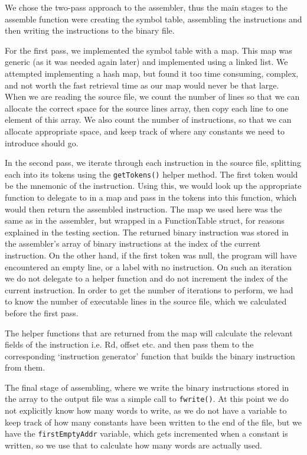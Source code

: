 \documentclass[a4paper]{article}
\begin{document}
We chose the two-pass approach to the assembler, thus the main stages to the assemble function were creating the symbol table, assembling the instructions and then writing the instructions to the binary file.

For the first pass, we implemented the symbol table with a map. This map was generic (as it was needed again later) and implemented using a linked list. We attempted implementing a hash map, but found it too time consuming, complex, and not worth the fast retrieval time as our map would never be that large. When we are reading the source file, we count the number of lines so that we can allocate the correct space for the source lines array, then copy each line to one element of this array. We also count the number of instructions, so that we can allocate appropriate space, and keep track of where any constants we need to introduce should go.

In the second pass, we iterate through each instruction in the source file, splitting each into its tokens using the \texttt{getTokens()} helper method. The first token would be the mnemonic of the instruction. Using this, we would look up the appropriate function to delegate to in a map and pass in the tokens into this function, which would then return the assembled instruction. The map we used here was the same as in the assembler, but wrapped in a FunctionTable struct, for reasons explained in the testing section. The returned binary instruction was stored in the assembler’s array of binary instructions at the index of the current instruction.  On the other hand, if the first token was null, the program will have encountered an empty line, or a label with no instruction. On such an iteration we do not delegate to a helper function and do not increment the index of the current instruction. In order to get the number of iterations to perform, we had to know the number of executable lines in the source file, which we calculated before the first pass.

The helper functions that are returned from the map will calculate the relevant fields of the instruction i.e. Rd, offset etc. and then pass them to the corresponding ‘instruction generator’ function that builds the binary instruction from them.

The final stage of assembling, where we write the binary instructions stored in the array to the output file was a simple call to \texttt{fwrite()}. At this point we do not explicitly know how many words to write, as we do not have a variable to keep track of how many constants have been written to the end of the file, but we have the \texttt{firstEmptyAddr} variable, which gets incremented when a constant is written, so we use that to calculate how many words are actually used.
\end{document}

